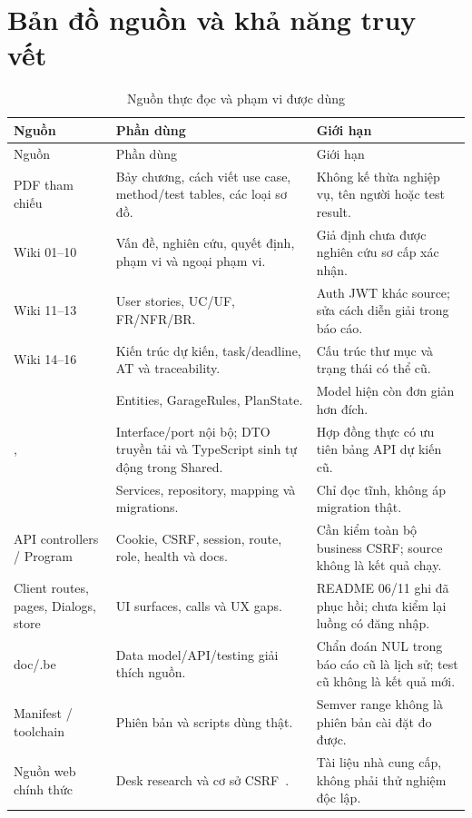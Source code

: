 \section{Bản đồ nguồn và khả năng truy vết}
\begin{smalltable}\begin{longtable}{L{4cm}L{6.8cm}L{3.8cm}}
\caption{Nguồn thực đọc và phạm vi được dùng}\label{tab:sources}\\\toprule Nguồn & Phần dùng & Giới hạn\\\midrule\endfirsthead
\toprule Nguồn & Phần dùng & Giới hạn\\\midrule\endhead
PDF tham chiếu & Bảy chương, cách viết use case, method/test tables, các loại sơ đồ. & Không kế thừa nghiệp vụ, tên người hoặc test result.\\
Wiki 01--10 & Vấn đề, nghiên cứu, quyết định, phạm vi và ngoại phạm vi. & Giả định chưa được nghiên cứu sơ cấp xác nhận.\\
Wiki 11--13 & User stories, UC/UF, FR/NFR/BR. & Auth JWT khác source; sửa cách diễn giải trong báo cáo.\\
Wiki 14--16 & Kiến trúc dự kiến, task/deadline, AT và traceability. & Cấu trúc thư mục và trạng thái có thể cũ.\\
 & Entities, GarageRules, PlanState. & Model hiện còn đơn giản hơn đích.\\
,  & Interface/port nội bộ; DTO truyền tải và TypeScript sinh tự động trong Shared. & Hợp đồng thực có ưu tiên bảng API dự kiến cũ.\\
 & Services, repository, mapping và migrations. & Chỉ đọc tĩnh, không áp migration thật.\\
API controllers / Program & Cookie, CSRF, session, route, role, health và docs. & Cần kiểm toàn bộ business CSRF; source không là kết quả chạy.\\
Client routes, pages, Dialogs, store & UI surfaces, calls và UX gaps. & README 06/11 ghi đã phục hồi; chưa kiểm lại luồng có đăng nhập.\\
doc/.be & Data model/API/testing giải thích nguồn. & Chẩn đoán NUL trong báo cáo cũ là lịch sử; test cũ không là kết quả mới.\\
Manifest / toolchain & Phiên bản và scripts dùng thật. & Semver range không là phiên bản cài đặt đo được.\\
Nguồn web chính thức & Desk research và cơ sở CSRF~\cite{fuelio,drivvo,fleetio,csrf}. & Tài liệu nhà cung cấp, không phải thử nghiệm độc lập.\\\bottomrule
\end{longtable}\end{smalltable}

